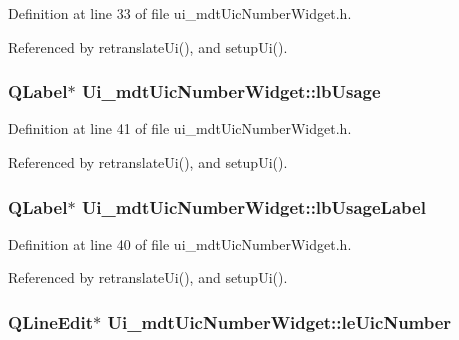 Definition at line 33 of file ui\-\_\-mdt\-Uic\-Number\-Widget.\-h.



Referenced by retranslate\-Ui(), and setup\-Ui().

\hypertarget{class_ui__mdt_uic_number_widget_a4f67e2ccc534e79e356adff60982c34a}{
\subsubsection[{lb\-Usage}]{\setlength{\rightskip}{0pt plus 5cm}Q\-Label$\ast$ Ui\-\_\-mdt\-Uic\-Number\-Widget\-::lb\-Usage}}\label{class_ui__mdt_uic_number_widget_a4f67e2ccc534e79e356adff60982c34a}


Definition at line 41 of file ui\-\_\-mdt\-Uic\-Number\-Widget.\-h.



Referenced by retranslate\-Ui(), and setup\-Ui().

\hypertarget{class_ui__mdt_uic_number_widget_a21f0b2fe73e990a45d2bacf5465b568f}{
\subsubsection[{lb\-Usage\-Label}]{\setlength{\rightskip}{0pt plus 5cm}Q\-Label$\ast$ Ui\-\_\-mdt\-Uic\-Number\-Widget\-::lb\-Usage\-Label}}\label{class_ui__mdt_uic_number_widget_a21f0b2fe73e990a45d2bacf5465b568f}


Definition at line 40 of file ui\-\_\-mdt\-Uic\-Number\-Widget.\-h.



Referenced by retranslate\-Ui(), and setup\-Ui().

\hypertarget{class_ui__mdt_uic_number_widget_a54f725b165fa3dd408f7d808b07ae939}{
\subsubsection[{le\-Uic\-Number}]{\setlength{\rightskip}{0pt plus 5cm}Q\-Line\-Edit$\ast$ Ui\-\_\-mdt\-Uic\-Number\-Widget\-::le\-Uic\-Number}}\label{class_ui__mdt_uic_number_widget_a54f725b165fa3dd408f7d808b07ae939}


